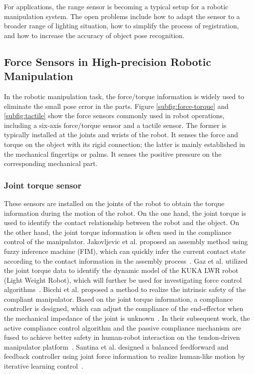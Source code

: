 \documentclass[journal,twoside,web]{ieeecolor}
\begin{document}
For applications, the range sensor is becoming a typical setup for a robotic manipulation system. The open problems include how to adapt the sensor to a broader range of lighting situation, how to simplify the process of registration, and how to increase the accuracy of object pose recognition.

\subsection{Force Sensors in High-precision Robotic Manipulation}
\label{subsec:force_sensor}

In the robotic manipulation task, the force/torque information is widely used to eliminate the small pose error in the parts. 
Figure \ref{subfig:force-torque} and \ref{subfig:tactile} show the force sensors commonly used in robot operations, including a six-axis force/torque sensor and a tactile sensor. 
The former is typically installed at the joints and wrists of the robot. It senses the force and torque on the object with its rigid connection; the latter is mainly established in the mechanical fingertips or palms. It senses the positive pressure on the corresponding mechanical part.

\subsubsection{Joint torque sensor}

These sensors are installed on the joints of the robot to obtain the torque information during the motion of the robot. 
On the one hand, the joint torque is used to identify the contact relationship between the robot and the object.
On the other hand, the joint torque information is often used in the compliance control of the manipulator. 
Jakovljevic et al. proposed an assembly method using fuzzy inference machine (FIM), which can quickly infer the current contact state according to the contact information in the assembly process~\cite{Jakovlijevic14}. 
Gaz et al. utilized the joint torque data to identify the dynamic model of the KUKA LWR robot (Light Weight Robot), which will further be used for investigating force control algorithms~\cite{Gaz2014}.
Bicchi et al. proposed a method to realize the intrinsic safety of the compliant manipulator. 
Based on the joint torque information, a compliance controller is designed, which can adjust the compliance of the end-effector when the mechanical impedance of the joint is unknown~\cite{Bicchi2001}. 
In their subsequent work, the active compliance control algorithm and the passive compliance mechanism are fused to achieve better safety in human-robot interaction on the tendon-driven manipulator platform~\cite{Schiavi2009}. 
Santina et al. designed a balanced feedforward and feedback controller using joint force information to realize human-like motion by iterative learning control~\cite{Della2017}.
\end{document}
